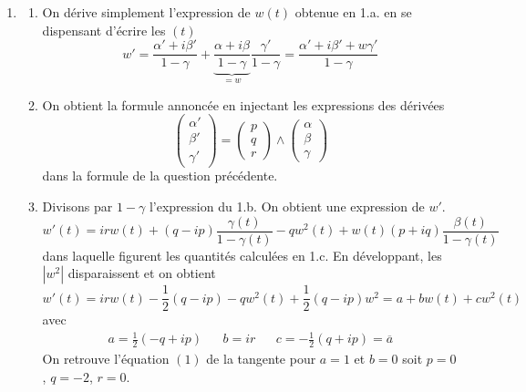 \begin{enumerate}
\item \begin{enumerate}
\item On dérive simplement l'expression de $w(t)$ obtenue en 1.a. en se dispensant d'écrire les $(t)$
\begin{displaymath}
 w'= \frac{\alpha'+i\beta'}{1-\gamma} + \underset{=w}{\underbrace{\frac{\alpha+i\beta}{1-\gamma}}}\frac{\gamma'}{1-\gamma}
= \frac{\alpha'+i\beta'+w\gamma'}{1-\gamma}
\end{displaymath}
\item On obtient la formule annoncée en injectant les expressions des dérivées
\begin{displaymath}
 \begin{pmatrix}
  \alpha'\\
\beta'\\
\gamma'
 \end{pmatrix}
=
\begin{pmatrix}
 p\\q\\r
\end{pmatrix}
\wedge
\begin{pmatrix}
 \alpha \\ \beta \\ \gamma
\end{pmatrix}
\end{displaymath}
dans la formule de la question précédente.
\item Divisons par $1-\gamma$ l'expression du 1.b. On obtient une expression de $w'$.
\begin{displaymath}
 w'(t)=
irw(t) + (q-ip)\frac{\gamma(t)}{1-\gamma(t)} -qw^2(t) +w(t)(p+iq)\frac{\beta(t)}{1-\gamma(t)}
\end{displaymath}
dans laquelle figurent les quantités calculées en 1.c. En développant, les $|w^2|$ disparaissent et on obtient
\begin{displaymath}
 w'(t) = irw(t)-\frac{1}{2}(q-ip)-qw^2(t) + \frac{1}{2}(q-ip)w^2
= a + bw(t) +cw^2(t)
\end{displaymath}
avec
\begin{align*}
 a=\frac{1}{2}(-q+ip) & & b=ir & & c=-\frac{1}{2}(q+ip)=\overline{a}
\end{align*}
On retrouve l'équation $(1)$ de la tangente pour $a=1$ et $b=0$ soit $p=0$, $q=-2$, $r=0$.
\end{enumerate}

\end{enumerate}

